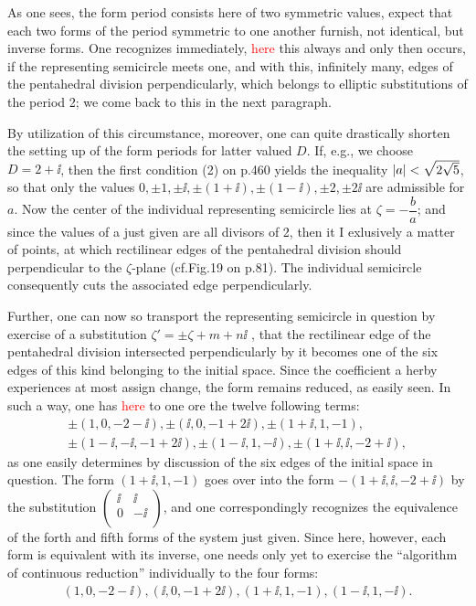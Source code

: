 As one sees, the form period consists here of two symmetric values, expect that each two forms of the period symmetric to one another furnish, not identical, but inverse forms. One recognizes immediately, \textcolor{red}{here} this always and only then occurs, if the representing semicircle meets one, and with this, infinitely many, edges of the pentahedral division perpendicularly, which belongs to elliptic substitutions of the period 2; we come back to this in the next paragraph.

By utilization of this circumstance, moreover, one can quite drastically shorten the setting up of the form periods for latter valued $D$. If, e.g., we choose $D=2+\ii$, then the first condition (2) on p.460 yields the inequality $\left|a\right|<\sqrt{2\sqrt{5}}$, so that only the values $0, \pm 1, \pm\ii, \pm(1+\ii), \pm(1-\ii), \pm 2, \pm 2\ii$ are admissible for $a$. Now the center of the individual representing semicircle lies at $\zeta=-\dfrac{b}{a}$; and since the values of a just given are all divisors of 2, then it I exlusively a matter of points, at which rectilinear edges of the pentahedral division should perpendicular to the $\zeta$-plane (cf.Fig.19 on p.81). The individual semicircle consequently cuts the associated edge perpendicularly.

Further, one can now so transport the representing semicircle in question by exercise of a substitution $\zeta'=\pm\zeta+m+n\ii$ , that the rectilinear edge of the pentahedral division intersected perpendicularly by it becomes one of the six edges of this kind belonging to the initial space. Since the coefficient a herby experiences at most assign change, the form remains reduced, as easily seen. In such a way, one has \textcolor{red}{here} to one ore the twelve following terms:
\begin{align}
    \pm(1,0,-2-\ii),\pm(\ii,0,-1+2\ii),\pm(1+\ii,1,-1),\\
    \pm(1-\ii,-\ii,-1+2\ii),\pm(1-\ii,1,-\ii),\pm(1+\ii,\ii,-2+\ii),
\end{align}
as one easily determines by discussion of the six edges of the initial space in question.
The form $(1+\ii,1,-1)$ goes over into the form $-(1+\ii,\ii,-2+\ii)$ by the substitution $\left(\begin{array}{cc}
\ii & \ii\\
0 & -\ii\\
\end{array}\right)$, and one correspondingly recognizes the equivalence of the forth and fifth forms of the system just given. Since here, however, each form is equivalent with its inverse, one needs only yet to exercise the “algorithm of continuous reduction” individually to the four forms:
\begin{align}
    (1,0,-2-\ii),(\ii,0,-1+2\ii),(1+\ii,1,-1),(1-\ii,1,-\ii).
\end{align}

